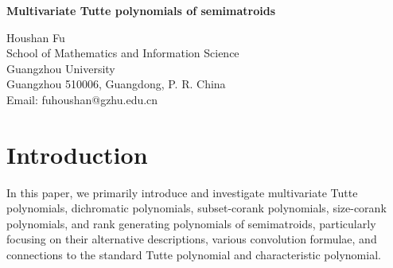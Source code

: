 \documentclass[12pt]{article}%
\numberwithin{equation}{section}
\begin{document}
\begin{center}
{\Large\bf Multivariate Tutte polynomials of semimatroids}\\[7pt]
\end{center}
\begin{center}
Houshan Fu\\[5pt]
School of Mathematics and Information Science\\
 Guangzhou University\\
Guangzhou 510006, Guangdong, P. R. China\\[5pt]
Email: fuhoushan@gzhu.edu.cn\\[15pt]
\end{center}
\begin{abstract}
We introduce and investigate multivariate Tutte polynomials, dichromatic polynomials, subset-corank polynomials, size-corank polynomials, and rank generating polynomials of semimatroids, which generalize the corresponding polynomial invariants of graphs and matroids. We primarily establish their deletion-contraction recurrences, basis activities expansions, and various convolution identities. These findings naturally extend Kook-Reiner-Stanton's convolution formula and Kung's convolution-multiplication identities for the Tutte polynomials of graphs and matroids to semimatroids.

 Semimatroid, multivariate Tutte polynomial, deletion-contraction recurrence, basis activities expansion, convolution formula
\vspace{1ex}\\
{\bf Mathematics Subject Classifications:} 05C31, 05B35
\end{abstract}
\section{Introduction}\label{Sec1}
In this paper, we primarily introduce and investigate multivariate Tutte polynomials, dichromatic polynomials, subset-corank polynomials, size-corank polynomials, and rank generating polynomials of semimatroids, particularly focusing on their alternative descriptions, various convolution formulae, and connections to the standard Tutte polynomial and characteristic polynomial.
\end{document}

